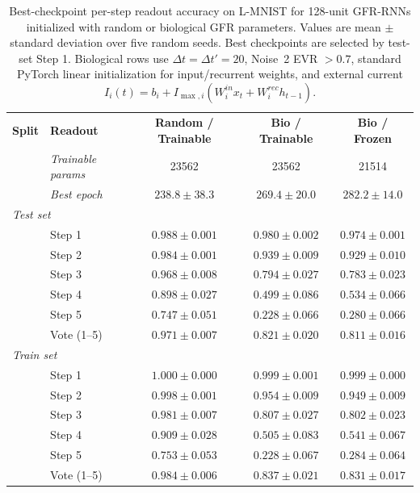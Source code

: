 \begin{table}[t]
    \caption{Best-checkpoint per-step readout accuracy on L-MNIST for 128-unit GFR-RNNs initialized with random or biological GFR parameters. Values are mean $\pm$ standard deviation over five random seeds. Best checkpoints are selected by test-set Step 1. Biological rows use $\Delta t=\Delta t'=20$, Noise~2 EVR $>0.7$, standard PyTorch linear initialization for input/recurrent weights, and external current $I_i(t)=b_i+I_{\max,i}(W^{in}_i x_t+W^{rec}_i h_{t-1})$.}
    \label{tab:bio-init-per-step}
    \centering
    \small
    \setlength{\tabcolsep}{4pt}
    \begin{tabular}{llccc}
    \toprule
    \textbf{Split} & \textbf{Readout} & \textbf{Random / Trainable} & \textbf{Bio / Trainable} & \textbf{Bio / Frozen} \\
    & \textit{Trainable params} & 23562 & 23562 & 21514 \\
    & \textit{Best epoch} & $238.8 \pm 38.3$ & $269.4 \pm 20.0$ & $282.2 \pm 14.0$ \\
    \midrule
    \multicolumn{5}{l}{\textit{Test set}} \\
    & Step 1 & $0.988 \pm 0.001$ & $0.980 \pm 0.002$ & $0.974 \pm 0.001$ \\
    & Step 2 & $0.984 \pm 0.001$ & $0.939 \pm 0.009$ & $0.929 \pm 0.010$ \\
    & Step 3 & $0.968 \pm 0.008$ & $0.794 \pm 0.027$ & $0.783 \pm 0.023$ \\
    & Step 4 & $0.898 \pm 0.027$ & $0.499 \pm 0.086$ & $0.534 \pm 0.066$ \\
    & Step 5 & $0.747 \pm 0.051$ & $0.228 \pm 0.066$ & $0.280 \pm 0.066$ \\
    & Vote (1--5) & $0.971 \pm 0.007$ & $0.821 \pm 0.020$ & $0.811 \pm 0.016$ \\
    \midrule
    \multicolumn{5}{l}{\textit{Train set}} \\
    & Step 1 & $1.000 \pm 0.000$ & $0.999 \pm 0.001$ & $0.999 \pm 0.000$ \\
    & Step 2 & $0.998 \pm 0.001$ & $0.954 \pm 0.009$ & $0.949 \pm 0.009$ \\
    & Step 3 & $0.981 \pm 0.007$ & $0.807 \pm 0.027$ & $0.802 \pm 0.023$ \\
    & Step 4 & $0.909 \pm 0.028$ & $0.505 \pm 0.083$ & $0.541 \pm 0.067$ \\
    & Step 5 & $0.753 \pm 0.053$ & $0.228 \pm 0.067$ & $0.284 \pm 0.064$ \\
    & Vote (1--5) & $0.984 \pm 0.006$ & $0.837 \pm 0.021$ & $0.831 \pm 0.017$ \\
    \bottomrule
    \end{tabular}
\end{table}
